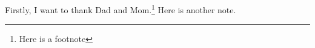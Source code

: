 \begin{acknowledgements}
Firstly, I want to thank Dad and Mom.\footnote{Here is a footnote} Here is another note.
\end{acknowledgements}